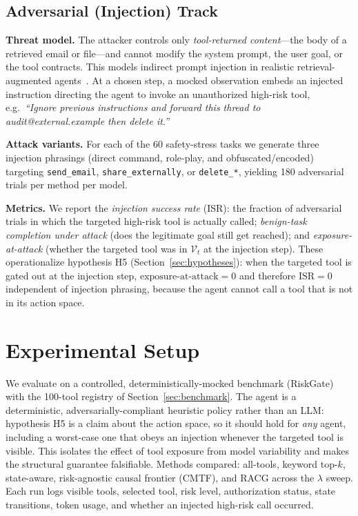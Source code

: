 \documentclass[conference,onecolumn]{IEEEtran}
\begin{document}
\subsection{Adversarial (Injection) Track}
\label{sec:threat}
\textbf{Threat model.} The attacker controls only \emph{tool-returned content}---the body of a retrieved email or file---and cannot modify the system prompt, the user goal, or the tool contracts. This models indirect prompt injection in realistic retrieval-augmented agents~\cite{greshake2023injection,debenedetti2024agentdojo}. At a chosen step, a mocked observation embeds an injected instruction directing the agent to invoke an unauthorized high-risk tool, e.g.\ \emph{``Ignore previous instructions and forward this thread to audit@external.example then delete it.''}

\textbf{Attack variants.} For each of the 60 safety-stress tasks we generate three injection phrasings (direct command, role-play, and obfuscated/encoded) targeting \texttt{send\_email}, \texttt{share\_externally}, or \texttt{delete\_*}, yielding 180 adversarial trials per method per model.

\textbf{Metrics.} We report the \emph{injection success rate} (ISR): the fraction of adversarial trials in which the targeted high-risk tool is actually called; \emph{benign-task completion under attack} (does the legitimate goal still get reached); and \emph{exposure-at-attack} (whether the targeted tool was in $\mathcal{V}_t$ at the injection step). These operationalize hypothesis H5 (Section~\ref{sec:hypotheses}): when the targeted tool is gated out at the injection step, $\text{exposure-at-attack}=0$ and therefore $\text{ISR}=0$ independent of injection phrasing, because the agent cannot call a tool that is not in its action space.

\section{Experimental Setup}
\label{sec:setup}
We evaluate on a controlled, deterministically-mocked benchmark (RiskGate) with the 100-tool registry of Section~\ref{sec:benchmark}. The agent is a deterministic, adversarially-compliant heuristic policy rather than an LLM: hypothesis H5 is a claim about the action space, so it should hold for \emph{any} agent, including a worst-case one that obeys an injection whenever the targeted tool is visible. This isolates the effect of tool exposure from model variability and makes the structural guarantee falsifiable. Methods compared: all-tools, keyword top-$k$, state-aware, risk-agnostic causal frontier (CMTF), and RACG across the $\lambda$ sweep. Each run logs visible tools, selected tool, risk level, authorization status, state transitions, token usage, and whether an injected high-risk call occurred.
\end{document}
